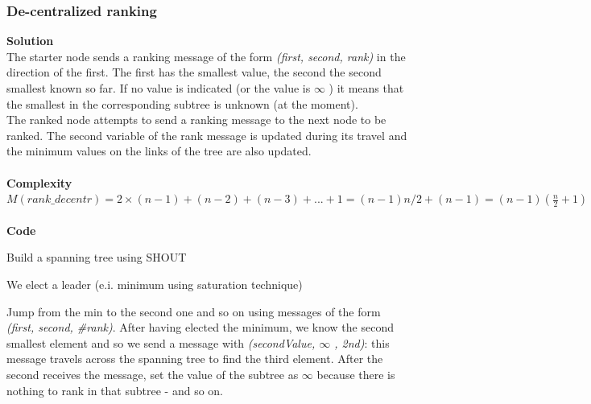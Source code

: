 \documentclass[paper=a4, fontsize=11pt]{scrartcl} %
\numberwithin{equation}{section} %
\numberwithin{figure}{section} %
\numberwithin{table}{section} %
\begin{document}
\subsubsection*{De-centralized ranking}
\textbf{Solution}\\
The starter node sends a ranking message of the form \textit{(first, second, rank)} in the direction of the first. The first has the smallest value, the second the second smallest known so far. If no value is indicated (or the value is $\infty$ ) it means that the smallest in the corresponding subtree is unknown (at the moment).\\
The ranked node attempts to send a ranking message to the next node to be ranked. The second variable of the rank message is updated during its travel and the minimum values on the links of the tree are also updated.\\ ~ \\
\textbf{Complexity} \\ $M(rank\_decentr) = 2\times(n-1)+ (n-2)+ (n-3)+ ...+ 1= (n-1)n/2+ (n-1)= (n-1)(\frac{n}{2}+1)$ \\ ~ \\
\textbf{Code}
\begin{compactitem}
\item Build a spanning tree using SHOUT
\item We elect a leader (e.i. minimum using saturation technique)
\item Jump from the min to the second one and so on using messages of the form\\ \textit{(first, second, \#rank)}. After having elected the minimum, we know the second smallest element and so we send a message with \textit{(secondValue, $\infty$ , 2nd)}: this message travels across the spanning tree to find the third element. After the second receives the message, set the value of the subtree as $\infty$ because there is nothing to rank in that subtree - and so on. 
\end{compactitem}
~ \\ 
\end{document}

